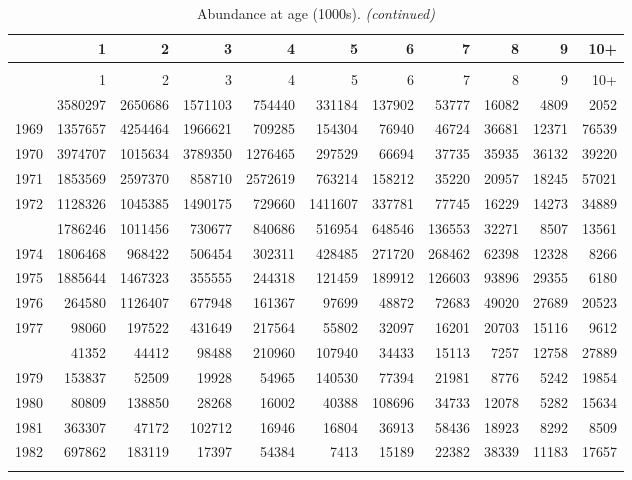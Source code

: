 \documentclass[
]{article}
\begin{document}
\begin{longtable}[t]{lrrrrrrrrrr}
\caption{\label{tab:NAA-table}Abundance at age (1000s).}\\
\toprule
  & 1 & 2 & 3 & 4 & 5 & 6 & 7 & 8 & 9 & 10+\\
\midrule
\endfirsthead
\caption[]{Abundance at age (1000s). \textit{(continued)}}\\
\toprule
  & 1 & 2 & 3 & 4 & 5 & 6 & 7 & 8 & 9 & 10+\\
\midrule
\endhead

\endfoot
\bottomrule
\endlastfoot
1968 & 3580297 & 2650686 & 1571103 & 754440 & 331184 & 137902 & 53777 & 16082 & 4809 & 2052\\
1969 & 1357657 & 4254464 & 1966621 & 709285 & 154304 & 76940 & 46724 & 36681 & 12371 & 76539\\
1970 & 3974707 & 1015634 & 3789350 & 1276465 & 297529 & 66694 & 37735 & 35935 & 36132 & 39220\\
1971 & 1853569 & 2597370 & 858710 & 2572619 & 763214 & 158212 & 35220 & 20957 & 18245 & 57021\\
1972 & 1128326 & 1045385 & 1490175 & 729660 & 1411607 & 337781 & 77745 & 16229 & 14273 & 34889\\
\addlinespace
1973 & 1786246 & 1011456 & 730677 & 840686 & 516954 & 648546 & 136553 & 32271 & 8507 & 13561\\
1974 & 1806468 & 968422 & 506454 & 302311 & 428485 & 271720 & 268462 & 62398 & 12328 & 8266\\
1975 & 1885644 & 1467323 & 355555 & 244318 & 121459 & 189912 & 126603 & 93896 & 29355 & 6180\\
1976 & 264580 & 1126407 & 677948 & 161367 & 97699 & 48872 & 72683 & 49020 & 27689 & 20523\\
1977 & 98060 & 197522 & 431649 & 217564 & 55802 & 32097 & 16201 & 20703 & 15116 & 9612\\
\addlinespace
1978 & 41352 & 44412 & 98488 & 210960 & 107940 & 34433 & 15113 & 7257 & 12758 & 27889\\
1979 & 153837 & 52509 & 19928 & 54965 & 140530 & 77394 & 21981 & 8776 & 5242 & 19854\\
1980 & 80809 & 138850 & 28268 & 16002 & 40388 & 108696 & 34733 & 12078 & 5282 & 15634\\
1981 & 363307 & 47172 & 102712 & 16946 & 16804 & 36913 & 58436 & 18923 & 8292 & 8509\\
1982 & 697862 & 183119 & 17397 & 54384 & 7413 & 15189 & 22382 & 38339 & 11183 & 17657\\
\addlinespace

\end{longtable}
\end{document}
